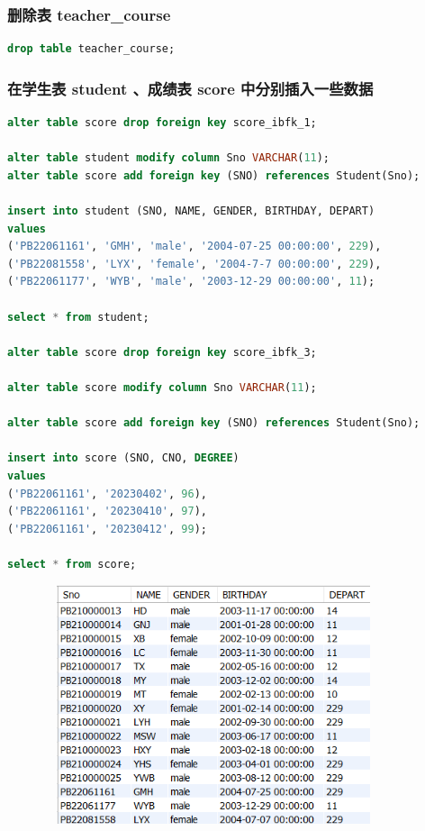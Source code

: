 \documentclass{ctexart}
\begin{document}
\subsubsection{删除表 teacher\_course}
\begin{lstlisting}[language=sql]
	drop table teacher_course;	
\end{lstlisting}
\subsubsection{在学生表 student 、成绩表 score 中分别插入一些数据}
\begin{lstlisting}[language=sql]
alter table score drop foreign key score_ibfk_1;  
 
alter table student modify column Sno VARCHAR(11);  
alter table score add foreign key (SNO) references Student(Sno);  
  
insert into student (SNO, NAME, GENDER, BIRTHDAY, DEPART)  
values   
('PB22061161', 'GMH', 'male', '2004-07-25 00:00:00', 229),  
('PB22081558', 'LYX', 'female', '2004-7-7 00:00:00', 229),  
('PB22061177', 'WYB', 'male', '2003-12-29 00:00:00', 11); 
 
select * from student;  
 
alter table score drop foreign key score_ibfk_3;  
  
alter table score modify column Sno VARCHAR(11);  

alter table score add foreign key (SNO) references Student(Sno);  
  
insert into score (SNO, CNO, DEGREE)  
values  
('PB22061161', '20230402', 96),  
('PB22061161', '20230410', 97),  
('PB22061161', '20230412', 99);  

select * from score; 
\end{lstlisting}
\begin{figure}[H]
	\centering 
	\includegraphics[height=7cm,width=10cm]{14.png}
	\end{figure}
\end{document}
